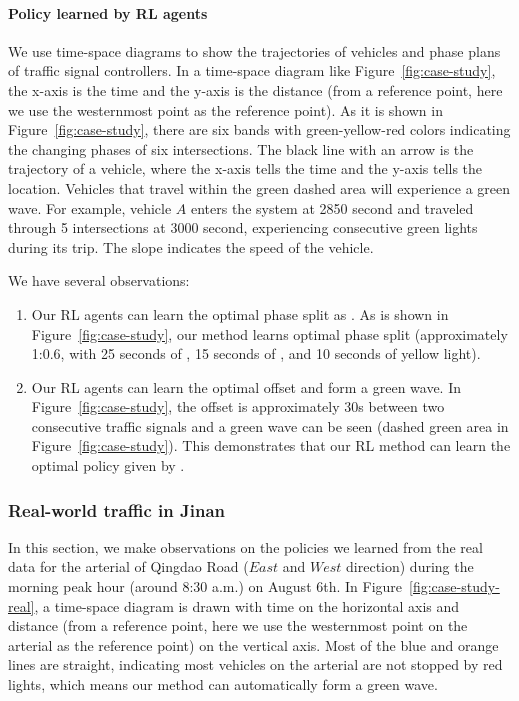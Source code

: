 \paragraph{Policy learned by RL agents}
We use time-space diagrams to show the trajectories of vehicles and phase plans of traffic signal controllers. In a time-space diagram like Figure~\ref{fig:case-study}, the x-axis is the time and the y-axis is the distance (from a reference point, here we use the westernmost point as the reference point). As it is shown in Figure~\ref{fig:case-study}, there are six bands with green-yellow-red colors indicating the changing phases of six intersections. The black line with an arrow is the trajectory of a vehicle, where the x-axis tells the time and the y-axis tells the location. Vehicles that travel within the green dashed area will experience a green wave. For example, vehicle $A$ enters the system at 2850 second and traveled through 5 intersections at 3000 second, experiencing consecutive green lights during its trip. The slope indicates the speed of the vehicle. 

We have several observations:
\begin{enumerate}[wide,noitemsep,topsep=0pt]
    \item Our RL agents can learn the optimal phase split as \Greenwave.  As is shown in Figure~\ref{fig:case-study}, our method learns optimal phase split (approximately 1:0.6, with 25 seconds of \WE, 15 seconds of \SN, and 10 seconds of yellow light). 
    \item Our RL agents can learn the optimal offset and form a green wave. In Figure~\ref{fig:case-study}, the offset is approximately 30s between two consecutive traffic signals and a green wave can be seen (dashed green area in Figure~\ref{fig:case-study}). This demonstrates that our RL method can learn the optimal policy given by \Greenwave. 
\end{enumerate}

\subsubsection{Real-world traffic in Jinan}

In this section, we make observations on the policies we learned from the real data for the arterial of Qingdao Road ($East$ and $West$ direction) during the morning peak hour (around 8:30 a.m.) on August 6th.  In Figure~\ref{fig:case-study-real}, a time-space diagram is drawn with time on the horizontal axis and distance (from a reference point, here we use the westernmost point on the arterial as the reference point) on the vertical axis. Most of the blue and orange lines are straight, indicating most vehicles on the arterial are not stopped by red lights, which means our method can automatically form a green wave.

